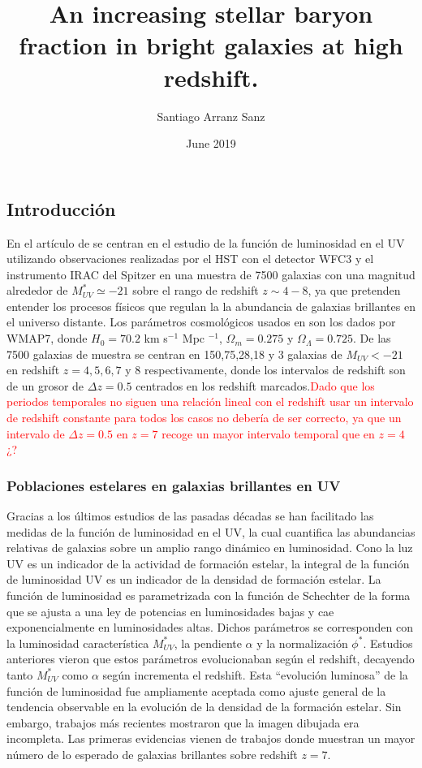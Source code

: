 \documentclass{article}
\title{An increasing stellar baryon fraction in bright galaxies at high redshift.}
\author{Santiago Arranz Sanz }
\date{June 2019}
\begin{document}
\maketitle

\subsection*{Introducción}
En el artículo de \cite{finkelstein2015increasing} se centran en el estudio de la función de luminosidad en el UV utilizando observaciones realizadas por el HST con el detector WFC3 y el instrumento IRAC del Spitzer en una muestra de 7500 galaxias con una magnitud alrededor de $M_{UV}^*\simeq -21$ sobre el rango de redshift $z\sim 4-8$, ya que pretenden entender los procesos físicos que regulan la la abundancia de galaxias brillantes en el universo distante. Los parámetros cosmológicos usados en \cite{finkelstein2015increasing} son los dados por WMAP7, donde $H_0=70.2$ km s$^{-1}$ Mpc $^{-1}$, $\Omega_m=0.275$ y $\Omega_\Lambda=0.725$. De las 7500 galaxias de muestra se centran en 150,75,28,18 y 3 galaxias de $M_{UV}<-21$ en redshift $z=4,5,6,7$ y 8 respectivamente, donde los intervalos de redshift son de un grosor de $\Delta z=0.5$ centrados en los redshift marcados.\textcolor{red}{Dado que los periodos temporales no siguen una relación lineal con el redshift usar un intervalo de redshift constante para todos los casos no debería de ser correcto, ya que un intervalo de $\Delta z=0.5$ en $z=7$ recoge un mayor intervalo temporal que en $z=4$ ¿?}\\


\subsubsection*{Poblaciones estelares en galaxias brillantes en UV}
Gracias a los últimos estudios de las pasadas décadas se han facilitado las medidas de la función de luminosidad en el UV, la cual cuantifica las abundancias relativas de galaxias sobre un amplio rango dinámico en luminosidad. Cono la luz UV es un indicador de la actividad de formación estelar, la integral de la función de luminosidad UV es un indicador de la densidad de formación estelar. La función de luminosidad es parametrizada con la función de Schechter de la forma que se ajusta a una ley de potencias en luminosidades bajas y cae exponencialmente en luminosidades altas. Dichos parámetros se corresponden con la luminosidad característica $M_{UV}^*$, la pendiente $\alpha$ y la normalización $\phi^*$. Estudios anteriores vieron que estos parámetros evolucionaban según el redshift, decayendo tanto $M_{UV}^*$ como $\alpha$ según incrementa el redshift. Esta ``evolución luminosa'' de la función de luminosidad fue ampliamente aceptada como ajuste general de la tendencia observable en la evolución de la densidad de la formación estelar. Sin embargo, trabajos más recientes mostraron que la imagen dibujada era incompleta. Las primeras evidencias vienen de trabajos donde muestran un mayor número de lo esperado de galaxias brillantes sobre redshift $z=7$. \\
\end{document}
